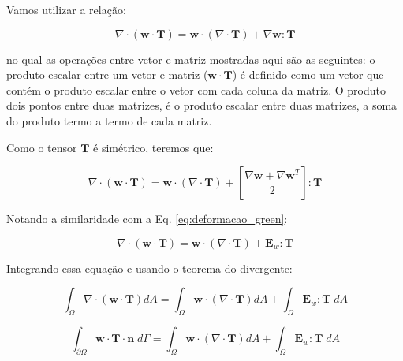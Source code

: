         Vamos utilizar a relação:

        \begin{equation}
            \nabla \cdot \left(\mathbf{w} \cdot \mathbf{T}\right) = \mathbf{w} \cdot \left(\nabla \cdot \mathbf{T}\right) + \nabla\mathbf{w} : \mathbf{T}
        \end{equation}

        \noindent no qual as operações entre vetor e matriz mostradas aqui são as seguintes: o produto escalar  entre um vetor e matriz ($\mathbf{w} \cdot \mathbf{T}$) é definido como um vetor que contém o produto escalar entre o vetor com cada coluna da matriz. O produto dois pontos entre duas matrizes, é o produto escalar entre duas matrizes, a soma do produto termo a termo de cada matriz.

        Como o tensor $\mathbf{T}$ é simétrico, teremos que:

        \begin{equation}
            \nabla \cdot \left(\mathbf{w} \cdot \mathbf{T}\right) = \mathbf{w} \cdot \left(\nabla \cdot \mathbf{T}\right) + \left[\frac{\nabla\mathbf{w} + \nabla\mathbf{w}^T}{2}\right] : \mathbf{T}
        \end{equation}

        Notando a similaridade com a Eq. \eqref{eq:deformacao_green}:

        \begin{equation}
            \nabla \cdot \left(\mathbf{w} \cdot \mathbf{T}\right) = \mathbf{w} \cdot \left(\nabla \cdot \mathbf{T}\right) + \mathbf{E}_w : \mathbf{T}
        \end{equation}


        Integrando essa equação e usando o teorema do divergente:

        \begin{equation*}
            \int_\Omega \nabla \cdot \left(\mathbf{w} \cdot \mathbf{T}\right)dA = 
            \int_\Omega \mathbf{w} \cdot \left(\nabla \cdot \mathbf{T}\right)dA +
            \int_\Omega \mathbf{E}_w : \mathbf{T} \; dA
        \end{equation*}

        \begin{equation*}
            \int_{\partial \Omega} \mathbf{w} \cdot \mathbf{T} \cdot \mathbf{n} \; d\Gamma = 
            \int_\Omega \mathbf{w} \cdot \left(\nabla \cdot \mathbf{T}\right)dA +
            \int_\Omega \mathbf{E}_w : \mathbf{T} \; dA
        \end{equation*}

